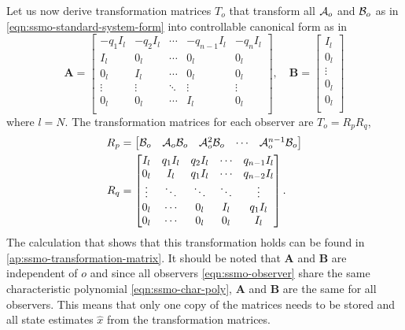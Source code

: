 Let us now derive transformation matrices $T_o$ that transform all $\mathcal{A}_o$ and $\mathcal{B}_o$ as in \eqref{eqn:ssmo-standard-system-form} into controllable canonical form as in \cite[Sec. 4.3.2]{Hespanha2018LinearTheory}
\begin{equation}\label{eqn:controllable-canonical-form}
    \mathbf{A} =
    \begin{bmatrix}
        -q_1I_l & -q_2I_l & \cdots & -q_{n-1}I_l & -q_nI_l \\
        I_l & 0_l & \cdots & 0_l & 0_l \\
        0_l & I_l & \cdots & 0_l & 0_l \\
        \vdots & \vdots & \ddots & \vdots & \vdots \\
        0_l & 0_l & \cdots & I_l & 0_l \\
    \end{bmatrix}, \quad
    \mathbf{B} = 
    \begin{bmatrix}
        I_l \\ 0_l \\ \vdots \\ 0_l \\ 0_l \\
    \end{bmatrix}
\end{equation}
where $l=N$. The transformation matrices for each observer are $T_o=R_pR_q$,
\begin{equation}
    \begin{split}
         R_p &=
        \begin{bmatrix}
            \mathcal{B}_o & \mathcal{A}_o\mathcal{B}_o & \mathcal{A}^{2}_o\mathcal{B}_o & \cdots & \mathcal{A}^{n-1}_o\mathcal{B}_o \\
        \end{bmatrix} \\
        R_q &=
        \begin{bmatrix}
            I_l & q_1I_l & q_2I_l & \cdots & q_{n-1}I_l \\
            0_l & I_l & q_1I_l & \cdots & q_{n-2}I_l \\
            \vdots & \ddots & \ddots & \ddots & \vdots \\
            0_l & \cdots & 0_l & I_l & q_1I_l \\
            0_l & \cdots & 0_l & 0_l & I_l \\
        \end{bmatrix}.
    \end{split}
\end{equation}
The calculation that shows that this transformation holds can be found in \autoref{ap:ssmo-transformation-matrix}. It should be noted that $\mathbf{A}$ and $\mathbf{B}$ are independent of $o$ and since all observers \eqref{eqn:ssmo-observer} share the same characteristic polynomial \eqref{eqn:ssmo-char-poly}, $\mathbf{A}$ and $\mathbf{B}$ are the same for all observers. This means that only one copy of the matrices needs to be stored and all state estimates $\hat{x}$ from the transformation matrices.

